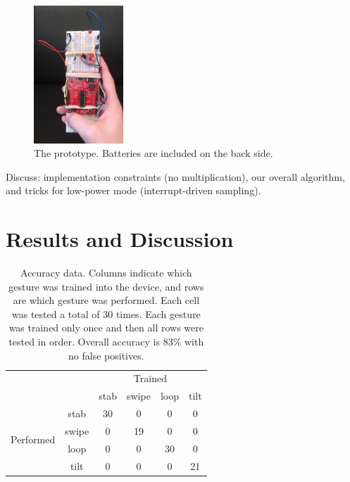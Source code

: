 \documentclass[12pt]{article}
\begin{document}
\begin{figure}[h!]
  \begin{center}
    \includegraphics[width=0.3\textwidth]{device-original.jpg}
  \caption{The prototype. Batteries are included on the back side.}
  \end{center}
\end{figure}

Discuss: implementation constraints (no multiplication), our overall algorithm,
and tricks for low-power mode (interrupt-driven sampling).

\section{Results and Discussion}

\begin{table}[h!]
\begin{center}
    \begin{tabular}{cc|cccc}
    & & \multicolumn{4}{c}{Trained} \\
    & & stab & swipe & loop & tilt \\
    \hline
    \multirow{4}{*}{Performed} & stab & 30 & 0 & 0 & 0  \\
    & swipe & 0 & 19 & 0 & 0 \\
    & loop & 0 & 0 & 30 & 0 \\
    & tilt & 0 & 0 & 0 & 21
    \end{tabular}
    \caption{Accuracy data. Columns indicate which gesture was
    trained into the device, and rows are which gesture was performed. Each
    cell was tested a total of 30 times. Each gesture was trained only once
    and then all rows were tested in order. Overall accuracy is 83\% with no
    false positives.}
    \label{tbl:data}
\end{center}
\end{table}
\end{document}
